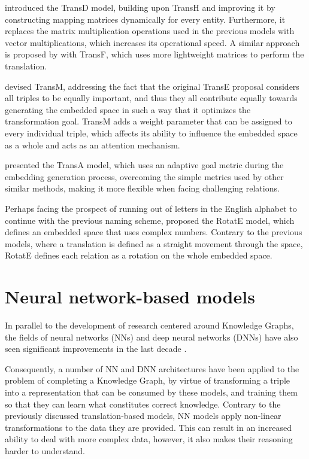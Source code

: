 \citet{ji2015} introduced the TransD model, building upon TransH and improving it by constructing mapping matrices dynamically for every entity. Furthermore, it replaces the matrix multiplication operations used in the previous models with vector multiplications, which increases its operational speed. A similar approach is proposed by \citet{do2018} with TransF, which uses more lightweight matrices to perform the translation.

\citet{fan2014} devised TransM, addressing the fact that the original TransE proposal considers all triples to be equally important, and thus they all contribute equally towards generating the embedded space in such a way that it optimizes the transformation goal. TransM adds a weight parameter that can be assigned to every individual triple, which affects its ability to influence the embedded space as a whole and acts as an attention mechanism.

\citet{xiao2015} presented the TransA model, which uses an adaptive goal metric during the embedding generation process, overcoming the simple metrics used by other similar methods, making it more flexible when facing challenging relations.

Perhaps facing the prospect of running out of letters in the English alphabet to continue with the previous naming scheme, \citet{sun2019} proposed the RotatE model, which defines an embedded space that uses complex numbers. Contrary to the previous models, where a translation is defined as a straight movement through the space, RotatE defines each relation as a rotation on the whole embedded space.

\section{Neural network-based models}\label{sec:emb-nn}
In parallel to the development of research centered around Knowledge Graphs, the fields of neural networks (NNs) and deep neural networks (DNNs) have also seen significant improvements in the last decade \cite{vaswani2017, brown2020, rombach2022}.

Consequently, a number of NN and DNN architectures have been applied to the problem of completing a Knowledge Graph, by virtue of transforming a triple into a representation that can be consumed by these models, and training them so that they can learn what constitutes correct knowledge. Contrary to the previously discussed translation-based models, NN models apply non-linear transformations to the data they are provided. This can result in an increased ability to deal with more complex data, however, it also makes their reasoning harder to understand.

